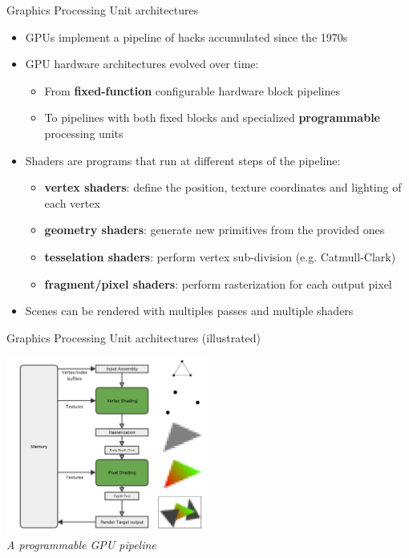 \begin{frame}{Graphics Processing Unit architectures}
  \begin{itemize}
  \item GPUs implement a pipeline of hacks accumulated since the 1970s
  \item GPU hardware architectures evolved over time:
    \begin{itemize}
    \item From \textbf{fixed-function} configurable hardware block pipelines
    \item To pipelines with both fixed blocks and specialized \textbf{programmable} processing units
    \end{itemize}
  \item Shaders are programs that run at different steps of the pipeline:
    \begin{itemize}
    \item \textbf{vertex shaders}: define the position, texture coordinates and lighting of each vertex
    \item \textbf{geometry shaders}: generate new primitives from the provided ones
    \item \textbf{tesselation shaders}: perform vertex sub-division (e.g. Catmull-Clark)
    \item \textbf{fragment/pixel shaders}: perform rasterization for each output pixel
    \end{itemize}
  \item Scenes can be rendered with multiples passes and multiple shaders
  \end{itemize}
\end{frame}

\begin{frame}{Graphics Processing Unit architectures (illustrated)}
  \begin{center}
  \includegraphics[width=0.5\textwidth]{slides/graphics-hardware/gpu-pipeline.png}\\
  \textit{\small A programmable GPU pipeline}
  \end{center}
\end{frame}

